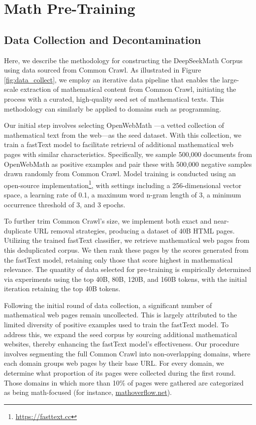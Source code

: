 \section{Math Pre-Training}

\subsection{Data Collection and Decontamination}
Here, we describe the methodology for constructing the DeepSeekMath Corpus using data sourced from Common Crawl. As illustrated in Figure \ref{fig:data_collect}, we employ an iterative data pipeline that enables the large-scale extraction of mathematical content from Common Crawl, initiating the process with a curated, high-quality seed set of mathematical texts. This methodology can similarly be applied to domains such as programming.

Our initial step involves selecting OpenWebMath \citep{openwebmath}—a vetted collection of mathematical text from the web—as the seed dataset. With this collection, we train a fastText model \citep{joulin2016fasttext} to facilitate retrieval of additional mathematical web pages with similar characteristics. Specifically, we sample 500,000 documents from OpenWebMath as positive examples and pair these with 500,000 negative samples drawn randomly from Common Crawl. Model training is conducted using an open-source implementation\footnote{\url{https://fasttext.cc}}, with settings including a 256-dimensional vector space, a learning rate of 0.1, a maximum word n-gram length of 3, a minimum occurrence threshold of 3, and 3 epochs. 

To further trim Common Crawl's size, we implement both exact and near-duplicate URL removal strategies, producing a dataset of 40B HTML pages. Utilizing the trained fastText classifier, we retrieve mathematical web pages from this deduplicated corpus. We then rank these pages by the scores generated from the fastText model, retaining only those that score highest in mathematical relevance. The quantity of data selected for pre-training is empirically determined via experiments using the top 40B, 80B, 120B, and 160B tokens, with the initial iteration retaining the top 40B tokens.

Following the initial round of data collection, a significant number of mathematical web pages remain uncollected. This is largely attributed to the limited diversity of positive examples used to train the fastText model. To address this, we expand the seed corpus by sourcing additional mathematical websites, thereby enhancing the fastText model’s effectiveness. Our procedure involves segmenting the full Common Crawl into non-overlapping domains, where each domain groups web pages by their base URL. For every domain, we determine what proportion of its pages were collected during the first round. Those domains in which more than 10\% of pages were gathered are categorized as being math-focused (for instance, \url{mathoverflow.net}). 

